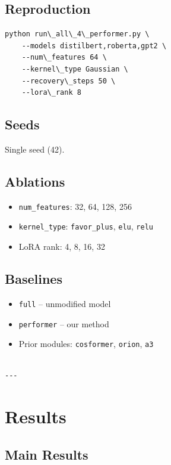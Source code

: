 \subsection{Reproduction}

\begin{lstlisting}
python run\_all\_4\_performer.py \
    --models distilbert,roberta,gpt2 \
    --num\_features 64 \
    --kernel\_type Gaussian \
    --recovery\_steps 50 \
    --lora\_rank 8
\end{lstlisting}

\subsection{Seeds}

Single seed (42).

\subsection{Ablations}

\begin{itemize}
\item \texttt{num\_features}: 32, 64, 128, 256
\item \texttt{kernel\_type}: \texttt{favor\_plus}, \texttt{elu}, \texttt{relu}
\item LoRA rank: 4, 8, 16, 32

\end{itemize}
\subsection{Baselines}

\begin{itemize}
\item \texttt{full} -- unmodified model
\item \texttt{performer} -- our method
\item Prior modules: \texttt{cosformer}, \texttt{orion}, \texttt{a3}
\end{itemize}
\begin{lstlisting}

---
\end{lstlisting}


\section{Results}

\subsection{Main Results}

